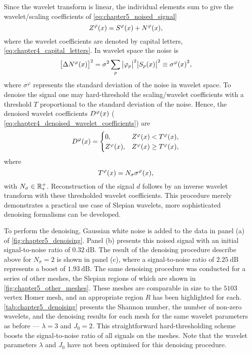 Since the wavelet transform is linear, the individual elements sum to give the wavelet/scaling coefficients of \cref{eq:chapter5_noised_signal}
%
\begin{equation}
	Z^{\varphi}(x)
	= S^{\varphi}(x) + N^{\varphi}(x),
\end{equation}
%
where the wavelet coefficients are denoted by capital letters, \ie{} \cref{eq:chapter4_capital_letters}.
In wavelet space the noise is
%
\begin{equation}
	{\big[\Delta N^{\varphi}(x)\big]}^{2}
	= \sigma^{2} \displaystyle\sum\limits_{p} \big\lvert{\varphi}_{p}\big\rvert^{2} \big\lvert{S}_{p}(x)\big\rvert^{2}
	\equiv {\sigma^{\varphi}(x)}^{2},
\end{equation}
%
where \(\sigma^{\varphi}\) represents the standard deviation of the noise in wavelet space.
To denoise the signal one may hard-threshold the scaling/wavelet coefficients with a threshold \(T\) proportional to the standard deviation of the noise.
Hence, the denoised wavelet coefficients \(D^{\varphi}(x)\) (\eg{} \cref{eq:chapter4_denoised_wavelet_coefficients}) are
%
\begin{equation}
	D^{\varphi}(x) =
	\begin{cases}
		0,
		 & Z^{\varphi}(x) < T^{\varphi}(x),    \\
		Z^{\varphi}(x),
		 & Z^{\varphi}(x) \geq T^{\varphi}(x),
	\end{cases}
\end{equation}
%
where
%
\begin{equation}
	T^{\varphi}(x)
	= N_{\sigma}\sigma^{\varphi}(x),
\end{equation}
%
with \(N_{\sigma} \in \mathbb{R}_{\ast}^{+}{}\).
Reconstruction of the signal \(d\) follows by an inverse wavelet transform with these thresholded wavelet coefficients.
This procedure merely demonstrates a practical use case of Slepian wavelets, more sophisticated denoising formalisms can be developed.

To perform the denoising, Gaussian white noise is added to the data in panel (a) of \cref{fig:chapter5_denoising}.
Panel (b) presents this noised signal with an initial signal-to-noise ratio of \(\SI{0.32}{\dB}\).
The result of the denoising procedure describe above for \(N_{\sigma}=2\) is shown in panel (c), where a signal-to-noise ratio of \(\SI{2.25}{\dB}\) represents a boost of \(\SI{1.93}{\dB}\).
The same denoising procedure was conducted for a series of other meshes, the Slepian regions of which are shown in \cref{fig:chapter5_other_meshes}.
These meshes are comparable in size to the \(\num{5103}\) vertex Homer mesh, and an appropriate region \(R\) has been highlighted for each.
\cref{tab:chapter5_denoising} presents the Shannon number, the number of non-zero wavelets, and the denoising results for each mesh for the same wavelet parameters as before --- \(\lambda=3\) and \(J_{0}=2\).
This straightforward hard-thresholding scheme boosts the signal-to-noise ratio of all signals on the meshes.
Note that the wavelet parameters \(\lambda{}\) and \(J_{0}\) have not been optimised for this denoising procedure.

